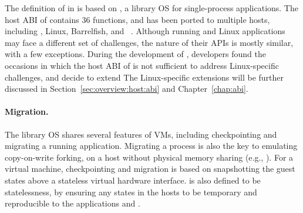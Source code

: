 The definition of \thehostabi{} in \graphene{} is based on
\drawbridge{},
a library OS for single-process \win{} applications.
The host ABI of \drawbridge{} 
contains 36 functions,
and has been ported to multiple hosts,
including \win{}, Linux, Barrelfish, and \sgx{}~\cite{porter11drawbridge,baumann14haven,mssql-on-linux,baumann13bascule}.
Although running \win{} and Linux applications may face
a different set of challenges,
the nature of their APIs is mostly similar, with a few exceptions.
During the development of \graphene{}, developers found the occasions in which
the host ABI of \drawbridge{}
is not sufficient to address Linux-specific challenges,
and decide to extend \thehostabi{}
The Linux-specific extensions will be further discussed in Section~\ref{sec:overview:host:abi} and Chapter~\ref{chap:abi}.


\paragraph{Migration.}
The \graphene{} library OS shares several features of VMs, including checkpointing and migrating a running application.
Migrating a process is also the key to emulating copy-on-write forking,
on a host without physical memory sharing (e.g., \sgx{}).
For a virtual machine, checkpointing and migration is based on snapshotting the guest states above a stateless virtual hardware interface. %
\Thehostabi{} is also defined to be statelessness,
by ensuring any states in the hosts to be temporary and reproducible to the applications and \libos{}.





\label{sec:overview:host:abi}


